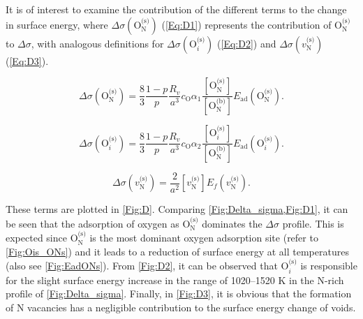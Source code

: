\documentclass[preprint,12pt,sort&compress]{elsarticle}
\newcommand{\?}{\stackrel{?}{=}}
\begin{document}
It is of interest to examine the contribution of the different terms to the change in surface energy, where $\Delta \sigma ( \text{O}_\text{N}^\text{(s)} )$ (\cref{Eq:D1}) represents the contribution of $\text{O}_\text{N}^\text{(s)}$ to $\Delta \sigma$, with analogous definitions for $\Delta \sigma ( \text{O}_i^\text{(s)} )$ (\cref{Eq:D2}) and $\Delta \sigma ( v_\text{N}^\text{(s)} )$ (\cref{Eq:D3}). 

\begin{equation}
\Delta \sigma ( \text{O}_\text{N}^{\text{(s)}} ) = \frac{8}{3} \frac{1-p}{p} \frac{R_v}{a^3} c_\text{O} \alpha_1 \frac{ [ \text{O}_\text{N}^{\text{(s)}} ] }{ [ \text{O}_\text{N}^{\text{(b)}} ] }  E_\text{ad}( \text{O}_\text{N}^{\text{(s)}} ).
\label{Eq:D1}
\end{equation}

\begin{equation}
\Delta \sigma ( \text{O}_i^{\text{(s)}} ) = \frac{8}{3} \frac{1-p}{p} \frac{R_v}{a^3} c_\text{O} \alpha_2 \frac{ [ \text{O}_i^{\text{(s)}} ] }{ [ \text{O}_\text{N}^{\text{(b)}} ] }  E_\text{ad}( \text{O}_i^{\text{(s)}} ).
\label{Eq:D2}
\end{equation}

\begin{equation}
\Delta \sigma (v_\text{N}^{\text{(s)}}) = \frac{2}{a^2} [ v_\text{N}^{\text{(s)}} ] E_f ( v_\text{N}^{\text{(s)}} ).
\label{Eq:D3}
\end{equation}

\noindent These terms are plotted in \cref{Fig:D}. Comparing \cref{Fig:Delta_sigma,Fig:D1}, it can be seen that the adsorption of oxygen as $\text{O}_\text{N}^\text{(s)}$ dominates the $\Delta \sigma$ profile. This is expected since $\text{O}_\text{N}^\text{(s)}$ is the most dominant oxygen adsorption site (refer to \cref{Fig:Ois_ONs}) and it leads to a reduction of surface energy at all temperatures (also see \cref{Fig:EadONs}). From \cref{Fig:D2}, it can be observed that $\text{O}_i^\text{(s)}$ is responsible for the slight surface energy increase in the range of 1020--1520 K in the N-rich profile of \cref{Fig:Delta_sigma}. Finally, in \cref{Fig:D3}, it is obvious that the formation of N vacancies has a negligible contribution to the surface energy change of voids.
\end{document}
